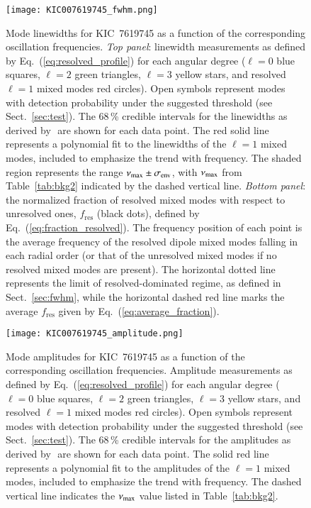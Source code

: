 \begin{figure}
   \centering
   \texttt{[image: KIC007619745\_fwhm.png]}
      \caption{Mode linewidths for KIC~7619745 as a function of the corresponding oscillation frequencies. \textit{Top panel}: linewidth measurements as defined by Eq.~(\ref{eq:resolved_profile}) for each angular degree ($\ell = 0$ blue squares, $\ell = 2$ green triangles, $\ell = 3$ yellow stars, and resolved $\ell = 1$ mixed modes red circles). Open symbols represent modes with detection probability under the suggested threshold (see Sect.~\ref{sec:test}). The 68\,\% credible intervals for the linewidths as derived by \diamonds\,\,are shown for each data point. The red solid line represents a polynomial fit to the linewidths of the $\ell = 1$ mixed modes, included to emphasize the trend with frequency. The shaded region represents the range $\nu_\mathrm{max} \pm \sigma_\mathrm{env}$, with $\nu_\mathrm{max}$ from Table~\ref{tab:bkg2} indicated by the dashed vertical line. \textit{Bottom panel}: the normalized fraction of resolved mixed modes with respect to unresolved ones, $f_\mathrm{res}$ (black dots), defined by Eq.~(\ref{eq:fraction_resolved}). The frequency position of each point is the average frequency of the resolved dipole mixed modes falling in each radial order (or that of the unresolved mixed modes if no resolved mixed modes are present). The horizontal dotted line represents the limit of resolved-dominated regime, as defined in Sect.~\ref{sec:fwhm}, while the horizontal dashed red line marks the average $f_\mathrm{res}$ given by Eq.~(\ref{eq:average_fraction}).}
    \label{fig:7619745fwhm}
\end{figure}


\begin{figure}
   \centering
   \texttt{[image: KIC007619745\_amplitude.png]}
      \caption{Mode amplitudes for KIC~7619745 as a function of the corresponding oscillation frequencies. Amplitude measurements as defined by Eq.~(\ref{eq:resolved_profile}) for each angular degree ($\ell = 0$ blue squares, $\ell = 2$ green triangles, $\ell = 3$ yellow stars, and resolved $\ell = 1$ mixed modes red circles). Open symbols represent modes with detection probability under the suggested threshold (see Sect.~\ref{sec:test}). The 68\,\% credible intervals for the amplitudes as derived by \diamonds\,\,are shown for each data point. The solid red line represents a polynomial fit to the amplitudes of the $\ell = 1$ mixed modes, included to emphasize the trend with frequency. The dashed vertical line indicates the $\nu_\mathrm{max}$ value listed in Table~\ref{tab:bkg2}.}
    \label{fig:7619745amplitude}
\end{figure}
\clearpage



